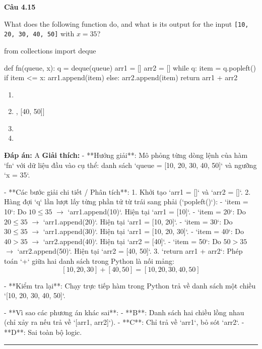 \documentclass[11pt,a4paper]{article}
\newenvironment{question}[1]{%
  \par\vspace{1em}\noindent\textbf{\large Câu #1}\par\vspace{0.4em}
}{%
  \par\vspace{1em}\hrule\vspace{0.6em}
}
\newenvironment{choices}{%
  \begin{enumerate}[label=\textbf{\Alph*.},leftmargin=2.2em,itemsep=2pt,topsep=3pt]
}{%
  \end{enumerate}
}
\newcommand{\choice}{\item}
\newenvironment{codebox}{%
  \begin{tcolorbox}[colback=gray!8!white,colframe=gray!50!black,arc=1.5mm,boxrule=0.6pt,left=3mm,right=3mm,top=2.5mm,bottom=2.5mm]
  \ttfamily\small
}{%
  \end{tcolorbox}
}
\begin{document}
\begin{question}{4.15}
What does the following function do, and what is its output for the input \texttt{[10, 20, 30, 40, 50]} with \(x = 35\)?
\begin{codebox}
from collections import deque

def fn(queue, x):
    q = deque(queue)
    arr1 = []
    arr2 = []
    while q:
        item = q.popleft()
        if item <= x:
            arr1.append(item)
        else:
            arr2.append(item)
    return arr1 + arr2
\end{codebox}
\begin{choices}
\choice [10, 20, 30, 40, 50]
\choice [[10, 20, 30], [40, 50]]
\choice [10, 20, 30]
\choice [20, 40]
\end{choices}
\textbf{Đáp án:} A
\textbf{Giải thích:} - **Hướng giải**:
  Mô phỏng từng dòng lệnh của hàm `fn` với dữ liệu đầu vào cụ thể: danh sách `queue = [10, 20, 30, 40, 50]` và ngưỡng `x = 35`.

- **Các bước giải chi tiết / Phân tích**:
  1. Khởi tạo `arr1 = []` và `arr2 = []`.
  2. Hàng đợi `q` lần lượt lấy từng phần tử từ trái sang phải (`popleft()`):
     - `item = 10`: Do \(10 \le 35\) \(\rightarrow\) `arr1.append(10)`. Hiện tại `arr1 = [10]`.
     - `item = 20`: Do \(20 \le 35\) \(\rightarrow\) `arr1.append(20)`. Hiện tại `arr1 = [10, 20]`.
     - `item = 30`: Do \(30 \le 35\) \(\rightarrow\) `arr1.append(30)`. Hiện tại `arr1 = [10, 20, 30]`.
     - `item = 40`: Do \(40 > 35\) \(\rightarrow\) `arr2.append(40)`. Hiện tại `arr2 = [40]`.
     - `item = 50`: Do \(50 > 35\) \(\rightarrow\) `arr2.append(50)`. Hiện tại `arr2 = [40, 50]`.
  3. `return arr1 + arr2`: Phép toán `+` giữa hai danh sách trong Python là nối mảng:
     \[
     [10, 20, 30] + [40, 50] = [10, 20, 30, 40, 50]
     \]

- **Kiểm tra lại**:
  Chạy trực tiếp hàm trong Python trả về danh sách một chiều `[10, 20, 30, 40, 50]`.

- **Vì sao các phương án khác sai**:
  - **B**: Danh sách hai chiều lồng nhau (chỉ xảy ra nếu trả về `[arr1, arr2]`).
  - **C**: Chỉ trả về `arr1`, bỏ sót `arr2`.
  - **D**: Sai toàn bộ logic.
\end{question}
\end{document}
